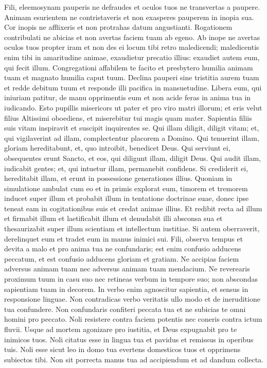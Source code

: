 \begin{biblechapter}  
\verse Fili, eleemosynam pauperis ne defraudes et oculos tuos ne transvertas a paupere. 
\verse Animam esurientem ne contristaveris et non exasperes pauperem in inopia sua. 
\verse Cor inopis ne afflixeris et non protrahas datum angustianti. 
\verse Rogationem contribulati ne abicias et non avertas faciem tuam ab egeno. 
\verse Ab inope ne avertas oculos tuos propter iram et non des ei locum tibi retro maledicendi; 
\verse maledicentis enim tibi in amaritudine animae, exaudietur precatio illius: exaudiet autem eum, qui fecit illum. 
\verse Congregationi affabilem te facito et presbytero humilia animam tuam et magnato humilia caput tuum. 
\verse Declina pauperi sine tristitia aurem tuam et redde debitum tuum et responde illi pacifica in mansuetudine. 
\verse Libera eum, qui iniuriam patitur, de manu opprimentis eum et non acide feras in anima tua in iudicando. 
\verse Esto pupillis misericors ut pater et pro viro matri illorum; 
\verse et eris velut filius Altissimi oboediens, et miserebitur tui magis quam mater. 
\verse Sapientia filiis suis vitam inspiravit et suscipit inquirentes se. 
\verse Qui illam diligit, diligit vitam; et, qui vigilaverint ad illam, complectentur placorem a Domino. 
\verse Qui tenuerint illam, gloriam hereditabunt, et, quo introibit, benedicet Deus. 
\verse Qui serviunt ei, obsequentes erunt Sancto, et eos, qui diligunt illam, diligit Deus. 
\verse Qui audit illam, iudicabit gentes; et, qui intuetur illam, permanebit confidens. 
\verse Si crediderit ei, hereditabit illam, et erunt in possessione generationes illius. 
\verse Quoniam in simulatione ambulat cum eo et in primis explorat eum, 
\verse timorem et tremorem inducet super illum et probabit illum in tentatione doctrinae suae, donec ipse teneat eam in cogitationibus suis et credat animae illius. 
\verse Et redibit recta ad illum et firmabit illum et laetificabit illum 
\verse et denudabit illi absconsa sua et thesaurizabit super illum scientiam et intellectum iustitiae. 
\verse Si autem oberraverit, derelinquet eum et tradet eum in manus inimici sui. 
\verse Fili, observa tempus et devita a malo 
\verse et pro anima tua ne confundaris; 
\verse est enim confusio adducens peccatum, et est confusio adducens gloriam et gratiam. 
\verse Ne accipias faciem adversus animam tuam nec adversus animam tuam mendacium. 
\verse Ne reverearis proximum tuum in casu suo 
\verse nec retineas verbum in tempore suo; non abscondas sapientiam tuam in decorem. 
\verse In verbo enim agnoscitur sapientia, et sensus in responsione linguae. 
\verse Non contradicas verbo veritatis ullo modo et de ineruditione tua confundere. 
\verse Non confundaris confiteri peccata tua et ne subicias te omni homini pro peccato. 
\verse Noli resistere contra faciem potentis nec coneris contra ictum fluvii. 
\verse Usque ad mortem agonizare pro iustitia, et Deus expugnabit pro te inimicos tuos. 
\verse Noli citatus esse in lingua tua et pavidus et remissus in operibus tuis. 
\verse Noli esse sicut leo in domo tua evertens domesticos tuos et opprimens subiectos tibi. 
\verse Non sit porrecta manus tua ad accipiendum et ad dandum collecta. 
\end{biblechapter}


